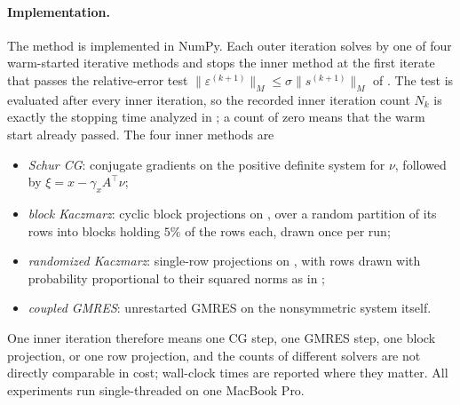 \documentclass[11pt]{article}
\begin{document}
\paragraph{Implementation.}
The method is implemented in NumPy.
Each outer iteration solves  by one of four warm-started iterative methods and stops the inner method at the first iterate that passes the relative-error test $\|\varepsilon^{(k+1)}\|_M \leq \sigma \|s^{(k+1)}\|_M$ of .
The test is evaluated after every inner iteration, so the recorded inner iteration count $N_k$ is exactly the stopping time analyzed in ; a count of zero means that the warm start already passed.
The four inner methods are
\begin{itemize}
    \item \emph{Schur CG}: conjugate gradients on the positive definite system  for $\nu$, followed by $\xi = x - \gamma_x A^\top \nu$;
    \item \emph{block Kaczmarz}: cyclic block projections on , over a random partition of its rows into blocks holding $5\%$ of the rows each, drawn once per run;
    \item \emph{randomized Kaczmarz}: single-row projections on , with rows drawn with probability proportional to their squared norms as in \cite{strohmer2007randomizedkaczmarzalgorithmexponential};
    \item \emph{coupled GMRES}: unrestarted GMRES on the nonsymmetric system  itself.
\end{itemize}
One inner iteration therefore means one CG step, one GMRES step, one block projection, or one row projection, and the counts of different solvers are not directly comparable in cost; wall-clock times are reported where they matter.
All experiments run single-threaded on one MacBook Pro.
\end{document}
